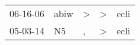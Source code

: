 \begin{supertabular}{lllll}
 06-16-06 &  abiw &  \textgreater &  \textgreater &  ecli \\
 05-03-14 &    N5 &             , &  \textgreater &  ecli \\
\end{supertabular}
